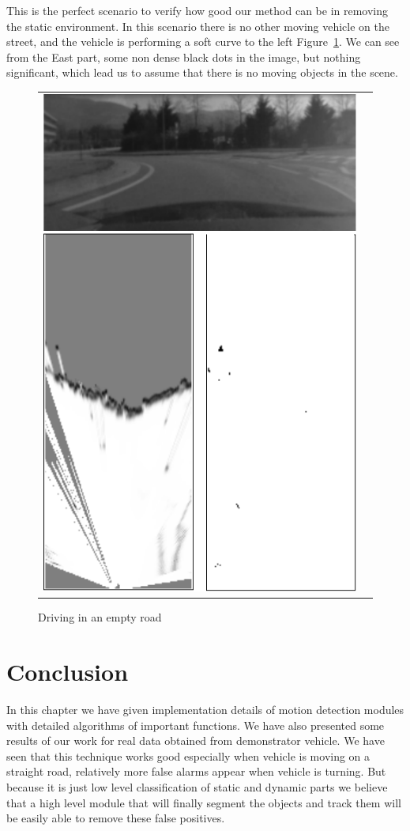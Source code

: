 This is the perfect scenario to verify how good our method can be in removing the static environment. In this scenario there is no other moving vehicle on the street, and the vehicle is performing a soft curve to the left Figure~\ref{fig:result:scenestatic}. We can see from the East part, some non dense black dots in the image, but nothing significant, which lead us to assume that there is no moving objects in the scene.

\begin{figure}[H]
   \centering
     \begin{tabular}{lr}
       \includegraphics[scale=0.60]{img/fig:result:scenestatic}
     \end{tabular}
   \caption{Driving in an empty road}
   \label{fig:result:scenestatic}
\end{figure}

\section{Conclusion}
In this chapter we have given implementation details of motion detection modules with detailed algorithms of important functions. We have also presented some results of our work for real data obtained from demonstrator vehicle. We have seen that this technique works good especially when vehicle is moving on a straight road, relatively more false alarms appear when vehicle is turning. But because it is just low level classification of static and dynamic parts we believe that a high level module that will finally segment the objects and track them will be easily able to remove these false positives.

